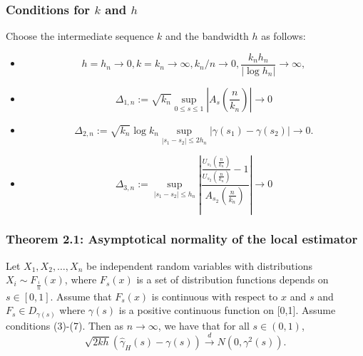 \documentclass{beamer}
\begin{document}
\begin{frame}
    \frametitle{Conditions for $k$ and $h$}
Choose the intermediate sequence $k$ and the bandwidth $h$ as follows:
\begin{itemize}
    \item \begin{equation}\tag{4}
        h=h_n\to 0, k=k_n \to \infty, k_n/n \to 0, \dfrac{k_nh_n}{|\log h_n|}\to \infty,   
    \end{equation}
 


\item \begin{equation}\tag{5}
    \Delta_{1,n}:=\sqrt{k_n}\sup_{0\le s\le 1}|A_s(\dfrac{n}{k_n})|\to 0 
\end{equation}

  

\item \begin{equation}\tag{6}
    \Delta_{2, n}:=\sqrt{k_{n}} \log k_{n} \sup _{\left|s_{1}-s_{2}\right| \leq 2 h_{n}}\left|\gamma\left(s_{1}\right)-\gamma\left(s_{2}\right)\right| \rightarrow 0.  
\end{equation}



\item \begin{equation}\tag{7}
    \Delta_{3, n}:=\sup _{\left|s_{1}-s_{2}\right| \leq h_{n}}\left|\frac{\frac{U_{s_{1}}\left(\frac{n}{k_{n}}\right)}{U_{s_{2}}\left(\frac{n}{k_{n}}\right)}-1}{A_{s_{2}}\left(\frac{n}{k_{n}}\right)}\right| \rightarrow 0 
\end{equation}
\end{itemize}
    

\end{frame}

\begin{frame}
    \frametitle{Theorem 2.1: Asymptotical normality of the local estimator}

    \begin{theorem}[2.1]
        Let $X_1,X_2,\dots, X_n$ be independent random variables with distributions $X_i \sim F_{\frac{i}{n}}(x)$, where $F_s(x)$ is a set of distribution functions depends on $s\in [0,1]$. Assume that $F_s(x)$ is continuous with respect to $x$ and $s$ and $F_s \in D_{\gamma(s)}$ where $\gamma(s)$ is a positive continuous function on [0,1]. Assume conditions (3)-(7). Then as $n \to \infty$, we have that for all $s\in (0,1)$, 
$$
\sqrt{2kh}(\hat{\gamma}_H(s)-\gamma(s))\stackrel{d}{\to}N(0,\gamma^2(s)).
$$    
    \end{theorem}
\end{frame}
\end{document}
